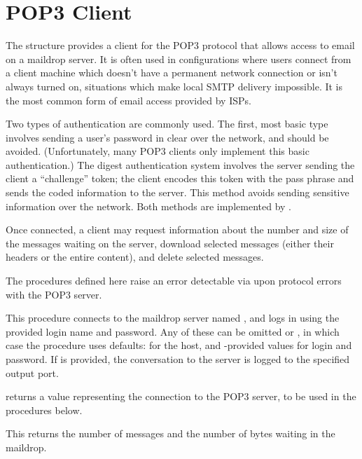 \chapter{POP3 Client}\label{cha:pop3}
%
The  structure provides a client for the POP3 protocol that
allows access to email on a maildrop server.  It is often used in
configurations where users connect from a client machine which doesn't
have a permanent network connection or isn't always turned on,
situations which make local SMTP delivery impossible.  It is the most
common form of email access provided by ISPs.

Two types of authentication are commonly used.  The first, most basic
type involves sending a user's password in clear over the network, and
should be avoided.  (Unfortunately, many POP3 clients only implement this
basic authentication.)  The digest authentication system involves the
server sending the client a ``challenge'' token; the client encodes
this token with the pass phrase and sends the coded information to the
server.  This method avoids sending sensitive information over the
network.  Both methods are implemented by .

Once connected, a client may request information about the number and
size of the messages waiting on the server, download selected messages
(either their headers or the entire content), and delete selected
messages.

The procedures defined here raise an error detectable via
 upon protocol errors with the POP3 server.

\begin{desc}
  This procedure connects to the maildrop server named ,
  and logs in using the provided login name and password.  Any of
  these can be omitted or \sharpf, in which case the procedure uses
  defaults:  for the host, and -provided
  values for login and password.  If  is provided, the
  conversation to the server is logged to the specified output port.
  
   returns a value representing the connection to the
  POP3 server, to be used in the procedures below.
\end{desc}

\begin{desc}
  This returns the number of messages and the number of bytes waiting in the
  maildrop.
\end{desc}

